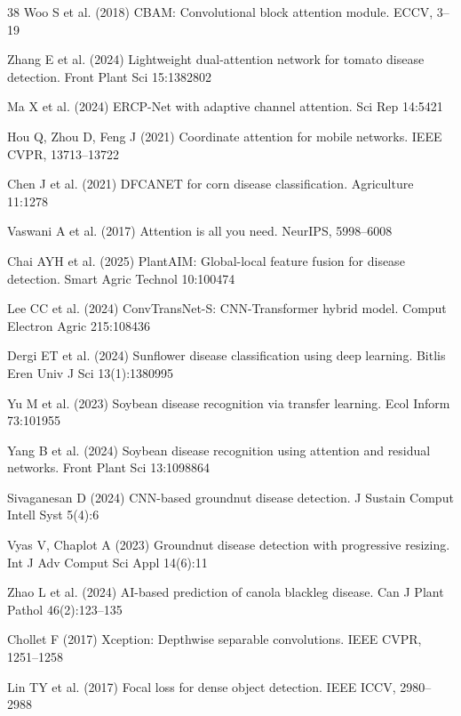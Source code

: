\documentclass[default, iicol]{sn-jnl}
\theoremstyle{thmstyleone}%
\theoremstyle{thmstyletwo}%
\theoremstyle{thmstylethree}%
\begin{document}
\begin{thebibliography}{38}
Woo S et al. (2018) CBAM: Convolutional block attention module. ECCV, 3–19

Zhang E et al. (2024) Lightweight dual-attention network for tomato disease detection. Front Plant Sci 15:1382802

Ma X et al. (2024) ERCP-Net with adaptive channel attention. Sci Rep 14:5421

Hou Q, Zhou D, Feng J (2021) Coordinate attention for mobile networks. IEEE CVPR, 13713–13722

Chen J et al. (2021) DFCANET for corn disease classification. Agriculture 11:1278

Vaswani A et al. (2017) Attention is all you need. NeurIPS, 5998–6008

Chai AYH et al. (2025) PlantAIM: Global-local feature fusion for disease detection. Smart Agric Technol 10:100474

Lee CC et al. (2024) ConvTransNet-S: CNN-Transformer hybrid model. Comput Electron Agric 215:108436

Dergi ET et al. (2024) Sunflower disease classification using deep learning. Bitlis Eren Univ J Sci 13(1):1380995

Yu M et al. (2023) Soybean disease recognition via transfer learning. Ecol Inform 73:101955

Yang B et al. (2024) Soybean disease recognition using attention and residual networks. Front Plant Sci 13:1098864

Sivaganesan D (2024) CNN-based groundnut disease detection. J Sustain Comput Intell Syst 5(4):6

Vyas V, Chaplot A (2023) Groundnut disease detection with progressive resizing. Int J Adv Comput Sci Appl 14(6):11

Zhao L et al. (2024) AI-based prediction of canola blackleg disease. Can J Plant Pathol 46(2):123–135

Chollet F (2017) Xception: Depthwise separable convolutions. IEEE CVPR, 1251–1258

Lin TY et al. (2017) Focal loss for dense object detection. IEEE ICCV, 2980–2988


\end{thebibliography}
\end{document}
